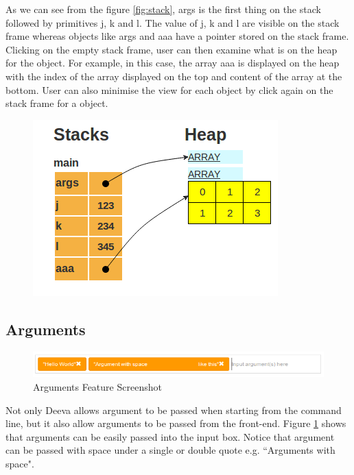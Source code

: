 \documentclass[11pt, a4paper]{article}
\begin{document}
As we can see from the figure \ref{fig:stack}, args is the first thing on the stack followed by primitives j, k and l.
The value of j, k and l are visible on the stack frame whereas objects like args and aaa have a pointer stored on the stack frame.
Clicking on the empty stack frame, user can then examine what is on the heap for the object.
For example, in this case, the array aaa is displayed on the heap with the index of the array displayed on the top and content of the array at the bottom. 
User can also minimise the view for each object by click again on the stack frame for a object.
\begin{figure}[h!]
\centering
\includegraphics[scale=0.5]{heap.png}
\end{figure}

\subsection{Arguments}
\begin{figure}[h!]
\centering
\includegraphics[scale=0.7]{argumentFeature.png}
\caption{Arguments Feature Screenshot}
\label{fig:argumentFeature}
\end{figure}
Not only Deeva allows argument to be passed when starting from the command line, but it also allow arguments to be passed from the front-end.
Figure \ref{fig:argumentFeature} shows that arguments can be easily passed into the input box. Notice that argument can be passed with space under a single or double quote e.g. ``Arguments with space".
\end{document}
